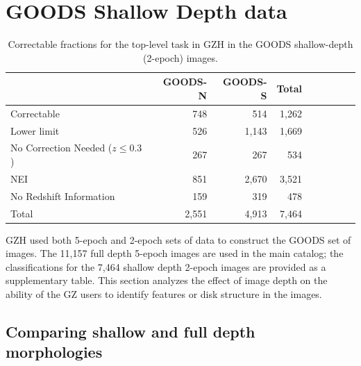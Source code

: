 \documentclass[twocolumn]{aastex6}
\begin{document}


\newpage
\clearpage

\appendix

\section{GOODS Shallow Depth data}


\begin{table}
\caption{Correctable fractions for the top-level task in GZH in the GOODS shallow-depth (2-epoch) images. \label{tbl:goods_shallow_categories}}
\begin{tabular}{lrrrrrrrr}
\hline\hline
                                   & GOODS-N & GOODS-S & Total \\
\hline
Correctable                        & 748     & 514     & 1,262 \\
Lower limit                        & 526     & 1,143   & 1,669 \\
No Correction Needed ($z \le 0.3$) & 267     & 267     & 534   \\ 
NEI                                & 851     & 2,670   & 3,521 \\
No Redshift Information            & 159     & 319     & 478   \\
Total                              & 2,551   & 4,913   & 7,464 \\
\hline\hline
\end{tabular}
\end{table}

GZH used both 5-epoch and 2-epoch sets of data to construct the GOODS set of images. The 11,157 full depth 5-epoch images are used in the main catalog; the classifications for the 7,464 shallow depth 2-epoch images are provided as a supplementary table. This section analyzes the effect of image depth on the ability of the GZ users to identify features or disk structure in the images. 

\subsection{Comparing shallow and full depth morphologies}
\end{document}
